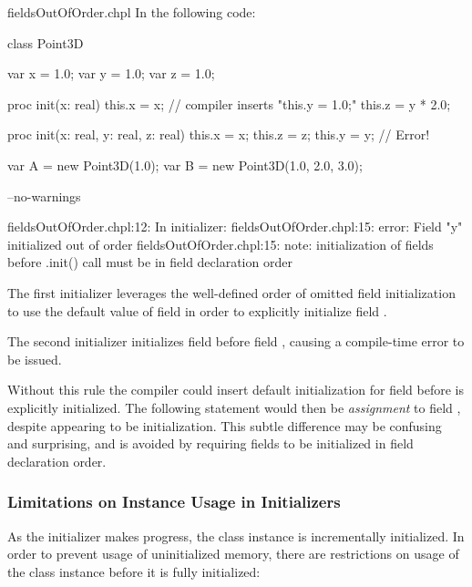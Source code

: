 \begin{chapelexample}{fieldsOutOfOrder.chpl}
In the following code:
\begin{chapel}
class Point3D {
  var x = 1.0;
  var y = 1.0;
  var z = 1.0;

  proc init(x: real) {
    this.x = x;
    // compiler inserts "this.y = 1.0;"
    this.z = y * 2.0;
  }

  proc init(x: real, y: real, z: real) {
    this.x = x;
    this.z = z;
    this.y = y; // Error!
  }
}

var A = new Point3D(1.0);
var B = new Point3D(1.0, 2.0, 3.0);
\end{chapel}
\begin{chapelcompopts}
--no-warnings
\end{chapelcompopts}
\begin{chapeloutput}
fieldsOutOfOrder.chpl:12: In initializer:
fieldsOutOfOrder.chpl:15: error: Field "y" initialized out of order
fieldsOutOfOrder.chpl:15: note: initialization of fields before .init() call must be in field declaration order
\end{chapeloutput}

The first initializer leverages the well-defined order of omitted field
initialization to use the default value of field  in order to
explicitly initialize field .

The second initializer initializes field  before field ,
causing a compile-time error to be issued.

\end{chapelexample}

\begin{rationale}
Without this rule the compiler could insert default initialization for field
 before  is explicitly initialized. The following statement
would then be {\em assignment} to field , despite appearing to be
initialization. This subtle difference may be confusing and surprising, and
is avoided by requiring fields to be initialized in field declaration order.
\end{rationale}

\subsubsection{Limitations on Instance Usage in Initializers}
\label{Limitations_on_Instance_Usage_in_Initializers}

As the initializer makes progress, the class instance is incrementally
initialized. In order to prevent usage of uninitialized memory, there are
restrictions on usage of the class instance before it is fully initialized:

